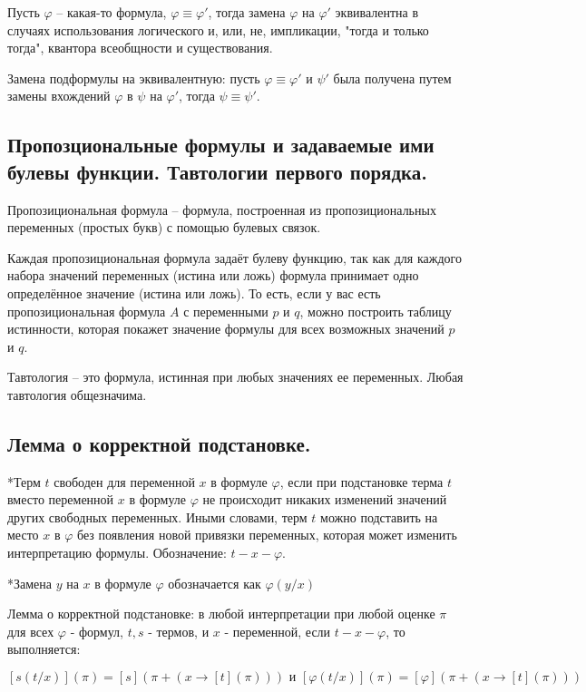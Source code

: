 \documentclass[a4paper, 10pt]{article}
\begin{document}
Пусть $\varphi$ -- какая-то формула, $\varphi\equiv\varphi'$, тогда замена $\varphi$ на $\varphi'$ эквивалентна в случаях использования логического и, или, не, импликации, "тогда и только тогда", квантора всеобщности и существования.

Замена подформулы на эквивалентную: пусть $\varphi\equiv\varphi'$ и $\psi'$ была получена путем замены вхождений $\varphi$ в $\psi$ на $\varphi'$, тогда $\psi\equiv\psi'$.

\subsection{Пропозциональные формулы и задаваемые ими булевы функции. Тавтологии первого порядка.}

Пропозициональная формула -- формула, построенная из пропозициональных переменных (простых букв) с помощью булевых связок.

Каждая пропозициональная формула задаёт булеву функцию, так как для каждого набора значений переменных (истина или ложь) формула принимает одно определённое значение (истина или ложь). То есть, если у вас есть пропозициональная формула $A$ с переменными $p$ и $q$, можно построить таблицу истинности, которая покажет значение формулы для всех возможных значений $p$ и $q$.

Тавтология -- это формула, истинная при любых значениях ее переменных. Любая тавтология общезначима.

\subsection{Лемма о корректной подстановке.}

*Терм $t$ свободен для переменной $x$ в формуле $\varphi$, если при подстановке терма $t$ вместо переменной $x$ в формуле $\varphi$ не происходит никаких изменений значений других свободных переменных. Иными словами, терм $t$ можно подставить на место $x$ в $\varphi$ без появления новой привязки переменных, которая может изменить интерпретацию формулы. Обозначение: $t-x-\varphi$.

*Замена $y$ на $x$ в формуле $\varphi$ обозначается как $\varphi(y/x)$

Лемма о корректной подстановке: в любой интерпретации при любой оценке $\pi$ для всех $\varphi$ - формул, $t,s$ - термов, и $x$ - переменной, если $t-x-\varphi$, то выполняется:

$$ [s(t/x)](\pi) = [s](\pi + (x \to [t](\pi))) \text{ и } [\varphi(t/x)](\pi)=[\varphi](\pi + (x\to [t](\pi))) $$
\end{document}
